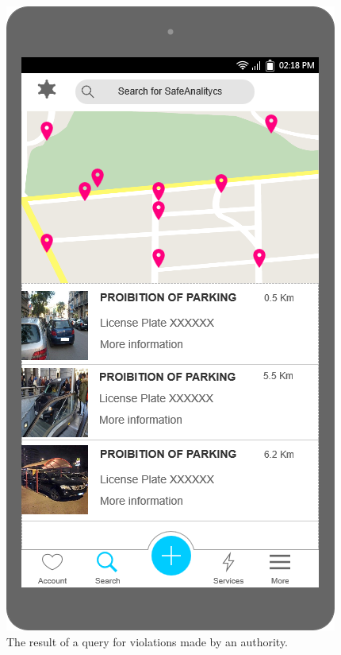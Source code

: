 \documentclass[a4paper]{article}
\newcommand{\mockupsize}{0.36\textwidth}
\begin{document}
\begin{figure}[H]
    \hfill
    \begin{minipage}[t]{\mockupsize}
        \includegraphics[width=\textwidth]{mockup/get_violations}
        \caption{The result of a query for violations made by an
authority.}
    \end{minipage}
\end{figure}
\end{document}

